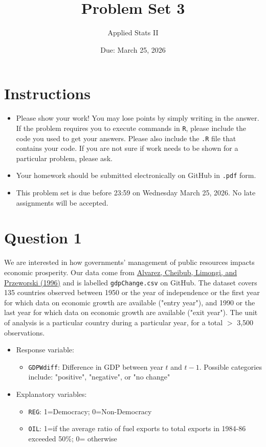 \documentclass[12pt,letterpaper]{article}
\title{Problem Set 3}
\date{Due: March 25, 2026}
\author{Applied Stats II}
\begin{document}
	\maketitle
	
	\section*{Instructions}
	\begin{itemize}
		\item Please show your work! You may lose points by simply writing in the answer. If the problem requires you to execute commands in \texttt{R}, please include the code you used to get your answers. Please also include the \texttt{.R} file that contains your code. If you are not sure if work needs to be shown for a particular problem, please ask.
		\item Your homework should be submitted electronically on GitHub in \texttt{.pdf} form.
		\item This problem set is due before 23:59 on Wednesday March 25, 2026. No late assignments will be accepted.
	\end{itemize}
	
	\vspace{.25cm}
	\section*{Question 1}
	\vspace{.25cm}
	\noindent We are interested in how governments' management of public resources impacts economic prosperity. Our data come from \href{https://www.researchgate.net/profile/Adam_Przeworski/publication/240357392_Classifying_Political_Regimes/links/0deec532194849aefa000000/Classifying-Political-Regimes.pdf}{Alvarez, Cheibub, Limongi, and Przeworski (1996)} and is labelled \texttt{gdpChange.csv} on GitHub. The dataset covers 135 countries observed between 1950 or the year of independence or the first year for which data on economic growth are available ("entry year"), and 1990 or the last year for which data on economic growth are available ("exit year"). The unit of analysis is a particular country during a particular year, for a total $>$ 3,500 observations. 
	
	\begin{itemize}
		\item Response variable: 
		\begin{itemize}
			\item \texttt{GDPWdiff}: Difference in GDP between year $t$ and $t-1$. Possible categories include: "positive", "negative", or "no change"
		\end{itemize}
		\item Explanatory variables: 
		\begin{itemize}
			\item \texttt{REG}: 1=Democracy; 0=Non-Democracy
			\item \texttt{OIL}: 1=if the average ratio of fuel exports to total exports in 1984-86 exceeded 50\%; 0= otherwise
		\end{itemize}
	\end{itemize}
	
\end{document}
